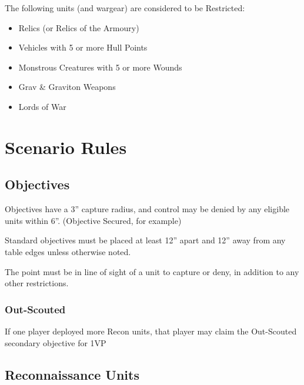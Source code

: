 \documentclass[letterpaper,twocolumn,oneside,titlepage]{book}
\providecommand{\tightlist}{%
  \setlength{\itemsep}{0pt}\setlength{\parskip}{0pt}}
\begin{document}
The following units (and wargear) are considered to be Restricted:

\begin{itemize}
\tightlist
\item
  Relics (or Relics of the Armoury)\\
\item
  Vehicles with 5 or more Hull Points\\
\item
  Monstrous Creatures with 5 or more Wounds\\
\item
  Grav \& Graviton Weapons\\
\item
  Lords of War
\end{itemize}

\chapter{\texorpdfstring{\textbf{Scenario
Rules}}{Scenario Rules}}\label{scenario-rules}

\section{\texorpdfstring{\textbf{Objectives}}{Objectives}}\label{objectives}

Objectives have a 3'' capture radius, and control may be denied by any
eligible units within 6''. (Objective Secured, for example)

Standard objectives must be placed at least 12'' apart and 12'' away
from any table edges unless otherwise noted.

The point must be in line of sight of a unit to capture or deny, in
addition to any other restrictions.

\subsection{\texorpdfstring{\textbf{Out-Scouted}}{Out-Scouted}}\label{out-scouted}

If one player deployed more Recon units, that player may claim the
Out-Scouted secondary objective for 1VP

\section{\texorpdfstring{\textbf{Reconnaissance
Units}}{Reconnaissance Units}}\label{reconnaissance-units}
\end{document}
